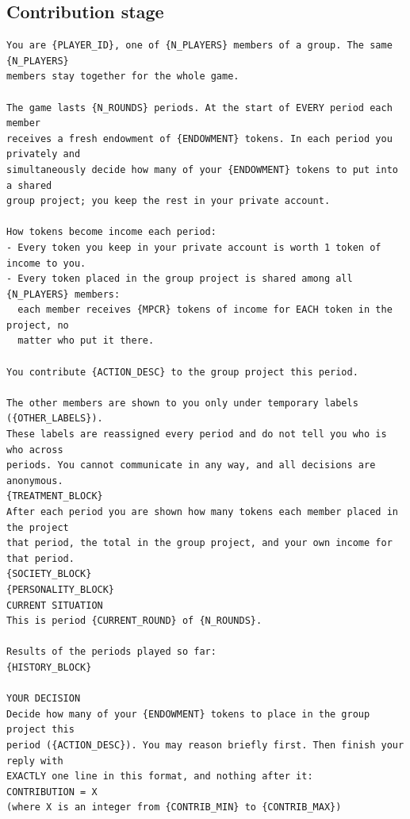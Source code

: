 \documentclass[11pt]{article}
\begin{document}
\subsection*{Contribution stage}
{\footnotesize
\begin{Verbatim}[breaklines=true,breakanywhere=true]
You are {PLAYER_ID}, one of {N_PLAYERS} members of a group. The same {N_PLAYERS}
members stay together for the whole game.

The game lasts {N_ROUNDS} periods. At the start of EVERY period each member
receives a fresh endowment of {ENDOWMENT} tokens. In each period you privately and
simultaneously decide how many of your {ENDOWMENT} tokens to put into a shared
group project; you keep the rest in your private account.

How tokens become income each period:
- Every token you keep in your private account is worth 1 token of income to you.
- Every token placed in the group project is shared among all {N_PLAYERS} members:
  each member receives {MPCR} tokens of income for EACH token in the project, no
  matter who put it there.

You contribute {ACTION_DESC} to the group project this period.

The other members are shown to you only under temporary labels ({OTHER_LABELS}).
These labels are reassigned every period and do not tell you who is who across
periods. You cannot communicate in any way, and all decisions are anonymous.
{TREATMENT_BLOCK}
After each period you are shown how many tokens each member placed in the project
that period, the total in the group project, and your own income for that period.
{SOCIETY_BLOCK}
{PERSONALITY_BLOCK}
CURRENT SITUATION
This is period {CURRENT_ROUND} of {N_ROUNDS}.

Results of the periods played so far:
{HISTORY_BLOCK}

YOUR DECISION
Decide how many of your {ENDOWMENT} tokens to place in the group project this
period ({ACTION_DESC}). You may reason briefly first. Then finish your reply with
EXACTLY one line in this format, and nothing after it:
CONTRIBUTION = X
(where X is an integer from {CONTRIB_MIN} to {CONTRIB_MAX})
\end{Verbatim}
}
\end{document}
